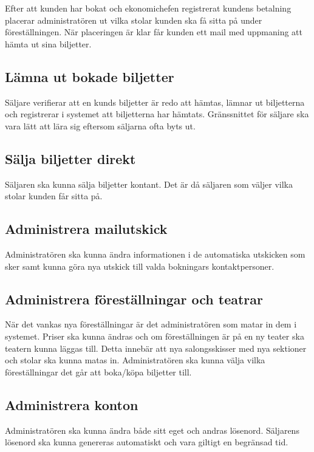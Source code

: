 \documentclass[a4paper, twoside, 11pt, titlepage]{article}
\begin{document}
	Efter att kunden har bokat och ekonomichefen registrerat kundens betalning placerar administratören ut vilka stolar kunden ska få sitta på under föreställningen. När placeringen är klar får kunden ett mail med uppmaning att hämta ut sina biljetter.

	\subsection{Lämna ut bokade biljetter}


	Säljare verifierar att en kunds biljetter är redo att hämtas, lämnar ut biljetterna och registrerar i systemet att biljetterna har hämtats. Gränssnittet för säljare ska vara lätt att lära sig eftersom säljarna ofta byts ut.

	\subsection{Sälja biljetter direkt}


	Säljaren ska kunna sälja biljetter kontant. Det är då säljaren som väljer vilka stolar kunden får sitta på.

	\subsection{Administrera mailutskick}


	Administratören ska kunna ändra informationen i de automatiska utskicken som sker samt kunna göra nya utskick till valda bokningars kontaktpersoner.

	\subsection{Administrera föreställningar och teatrar}


	När det vankas nya föreställningar är det administratören som matar in dem i systemet. Priser ska kunna ändras och om föreställningen är på en ny teater ska teatern kunna läggas till. Detta innebär att nya salongsskisser med nya sektioner och stolar ska kunna matas in. Administratören ska kunna välja vilka föreställningar det går att boka/köpa biljetter till.

	\subsection{Administrera konton}


	Administratören ska kunna ändra både sitt eget och andras lösenord. Säljarens lösenord ska kunna genereras automatiskt och vara giltigt en begränsad tid.
\end{document}
